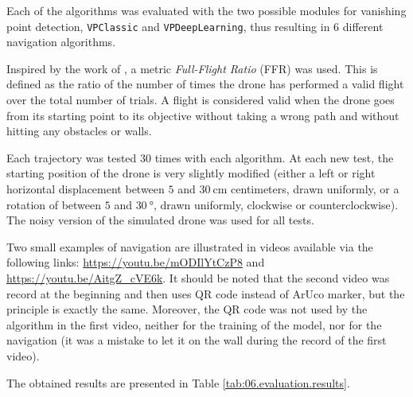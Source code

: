 Each of the algorithms was evaluated with the two possible modules for vanishing point detection, \texttt{VPClassic} and \texttt{VPDeepLearning}, thus resulting in $6$ different navigation algorithms.

Inspired by the work of \textcite{padhy2018deep}, a metric \emph{Full-Flight Ratio} (FFR) was used. This is defined as the ratio of the number of times the drone has performed a valid flight over the total number of trials. A flight is considered valid when the drone goes from its starting point to its objective without taking a wrong path and without hitting any obstacles or walls.

Each trajectory was tested $\num{30}$ times with each algorithm. At each new test, the starting position of the drone is very slightly modified (either a left or right horizontal displacement between $\num{5}$ and $\SI{30}{\centi\meter}$ centimeters, drawn uniformly, or a rotation of between $\num{5}$ and $\SI{30}{\degree}$, drawn uniformly, clockwise or counterclockwise). The noisy version of the simulated drone was used for all tests.

Two small examples of navigation are illustrated in videos available via the following links: \url{https://youtu.be/mODIlYtCzP8} and \url{https://youtu.be/AitgZ_cVE6k}. It should be noted that the second video was record at the beginning and then uses QR code instead of ArUco marker, but the principle is exactly the same. Moreover, the QR code was not used by the algorithm in the first video, neither for the training of the model, nor for the navigation (it was a mistake to let it on the wall during the record of the first video).

The obtained results are presented in Table \ref{tab:06.evaluation.results}.

